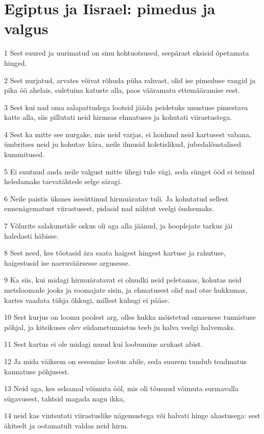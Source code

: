 \section*{Egiptus ja Iisrael: pimedus ja valgus}

\par 1 Sest suured ja uurimatud on sinu kohtuotsused, seepärast eksisid õpetamata hinged.
\par 2 Sest nurjatud, arvates võivat rõhuda püha rahvast, olid ise pimeduse vangid ja pika öö ahelais, suletuina katuste alla, paos vääramatu ettemääramise eest.
\par 3 Sest kui nad oma salapattudega lootsid jääda peidetuks unustuse pimestava katte alla, siis pillutati neid hirmsas ehmatuses ja kohutati viirastustega.
\par 4 Sest ka mitte see nurgake, mis neid varjas, ei hoidnud neid kartusest vabana, ümbritses neid ju kohutav kära, neile ilmusid koletislikud, jubedalõustalised kummitused.
\par 5 Ei suutnud anda neile valgust mitte ühegi tule vägi, seda sünget ööd ei teinud heledamaks taevatähtede selge säragi.
\par 6 Neile paistis üksnes isesüttinud hirmuäratav tuli. Ja kohutatud sellest ennenägematust viirastusest, pidasid nad nähtut veelgi õudsemaks.
\par 7 Võlurite salakunstide oskus oli aga alla jäänud, ja hooplejate tarkus jäi haledasti häbisse.
\par 8 Sest need, kes tõotasid ära saata haigest hingest kartuse ja rahutuse, haigestusid ise naeruväärsesse argusesse.
\par 9 Ka siis, kui midagi hirmuäratavat ei olnudki neid peletamas, kohutas neid metsloomade jooks ja roomajate sisin, ja ehmatusest olid nad otse hukkumas, kartes vaadata tühja õhkugi, millest kuhugi ei pääse.
\par 10 Sest kurjus on loomu poolest arg, olles hukka mõistetud omaenese tunnistuse põhjal, ja kitsikuses olev südametunnistus teeb ju halva veelgi halvemaks.
\par 11 Sest kartus ei ole midagi muud kui loobumine arukast abist.
\par 12 Ja mida väiksem on seesmine lootus abile, seda suurem tundub teadmatus kannatuse põhjusest.
\par 13 Neid aga, kes selsamal võimuta ööl, mis oli tõusnud võimuta surmavalla sügavusest, tahtsid magada nagu ikka,
\par 14 neid kas vintsutati viirastuslike nägemustega või halvati hinge ahastusega: sest äkitselt ja ootamatult valdas neid hirm.
